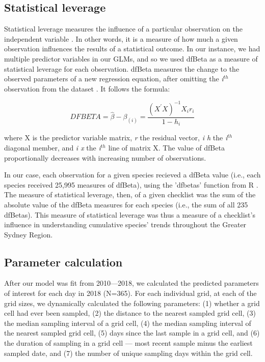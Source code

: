 \documentclass[9pt,twocolumn,twoside,lineno]{pnas-new}
\begin{document}
{\subsection*{Statistical leverage} Statistical leverage measures the influence of a particular observation on the independent variable \cite{cook1977detection}. In other words, it is a measure of how much a given observation influences the results of a statistical outcome. In our instance, we had multiple predictor variables in our GLMs, and so we used dfBeta as a measure of statistical leverage for each observation. dfBeta measures the change to the observed parameters of a new regression equation, after omitting the \textit{i$^{th}$} observation from the dataset \cite{belsley1980regression}. It follows the formula:

\begin{equation}
D F B E T A=\hat{\beta}-\beta_{(i)}=\frac{\left(X^{\prime} X\right)^{-1} X_{i} r_{i}}{1-h_{i}}
\end{equation}

where X is the predictor variable matrix, \textit{r} the residual vector, \textit{i h} the \textit{i$^{th}$} diagonal member, and \textit{i x} the \textit{i$^{th}$} line of matrix X. The value of dfBeta proportionally decreases with increasing number of observations.

In our case, each observation for a given species recieved a dfBeta value (i.e., each species received 25,995 measures of dfBeta), using the 'dfbetas' function from R \cite{rcoreteam2018r}. The measure of statistical leverage, then, of a given checklist was the sum of the absolute value of the dfBeta measures for each species (i.e., the sum of all 235 dfBetas). This measure of statistical leverage was thus a measure of a checklist's influence in understanding cumulative species' trends throughout the Greater Sydney Region.

\subsection*{Parameter calculation} After our model was fit from 2010---2018, we calculated the predicted parameters of interest for each day in 2018 (N=365). For each individual grid, at each of the grid sizes, we dynamically calculated the following parameters: (1) whether a grid cell had ever been sampled, (2) the distance to the nearest sampled grid cell, (3) the median sampling interval of a grid cell, (4) the median sampling interval of the nearest sampled grid cell, (5) days since the last sample in a grid cell, and (6) the duration of sampling in a grid cell --- most recent sample minus the earliest sampled date, and (7) the number of unique sampling days within the grid cell.

}
\end{document}
